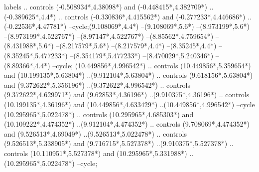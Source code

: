 {\begin{scope}[x=1mm,y=1mm,line width=\SCstroke mm,line cap=round,line join=round]
\begin{SCpart}{labels}
.. controls ({-0.508934*\SCF},{4.38098*\SCF}) and ({-0.448415*\SCF},{4.382709*\SCF}) ..({-0.389625*\SCF},{4.4*\SCF})
.. controls ({-0.330836*\SCF},{4.415562*\SCF}) and ({-0.277233*\SCF},{4.446686*\SCF}) ..({-0.22536*\SCF},{4.47781*\SCF})
--cycle; ({9.108069*\SCF},{4.4*\SCF})
--({9.108069*\SCF},{5.6*\SCF})
--({8.973199*\SCF},{5.6*\SCF})
--({8.973199*\SCF},{4.522767*\SCF})
--({8.97147*\SCF},{4.522767*\SCF})
--({8.85562*\SCF},{4.759654*\SCF})
--({8.431988*\SCF},{5.6*\SCF})
--({8.217579*\SCF},{5.6*\SCF})
--({8.217579*\SCF},{4.4*\SCF})
--({8.35245*\SCF},{4.4*\SCF})
--({8.35245*\SCF},{5.477233*\SCF})
--({8.354179*\SCF},{5.477233*\SCF})
--({8.470029*\SCF},{5.240346*\SCF})
--({8.89366*\SCF},{4.4*\SCF})
--cycle;
 ({10.449856*\SCF},{4.996542*\SCF})
.. controls ({10.449856*\SCF},{5.359654*\SCF}) and ({10.199135*\SCF},{5.63804*\SCF}) ..({9.912104*\SCF},{5.63804*\SCF})
.. controls ({9.618156*\SCF},{5.63804*\SCF}) and ({9.372622*\SCF},{5.356196*\SCF}) ..({9.372622*\SCF},{4.996542*\SCF})
.. controls ({9.372622*\SCF},{4.629971*\SCF}) and ({9.62853*\SCF},{4.36196*\SCF}) ..({9.910375*\SCF},{4.36196*\SCF})
.. controls ({10.199135*\SCF},{4.36196*\SCF}) and ({10.449856*\SCF},{4.633429*\SCF}) ..({10.449856*\SCF},{4.996542*\SCF})
--cycle
({10.295965*\SCF},{5.022478*\SCF})
.. controls ({10.295965*\SCF},{4.685303*\SCF}) and ({10.109222*\SCF},{4.474352*\SCF}) ..({9.912104*\SCF},{4.474352*\SCF})
.. controls ({9.708069*\SCF},{4.474352*\SCF}) and ({9.526513*\SCF},{4.69049*\SCF}) ..({9.526513*\SCF},{5.022478*\SCF})
.. controls ({9.526513*\SCF},{5.338905*\SCF}) and ({9.716715*\SCF},{5.527378*\SCF}) ..({9.910375*\SCF},{5.527378*\SCF})
.. controls ({10.110951*\SCF},{5.527378*\SCF}) and ({10.295965*\SCF},{5.331988*\SCF}) ..({10.295965*\SCF},{5.022478*\SCF})
--cycle;
\end{SCpart}
\end{scope}
}
